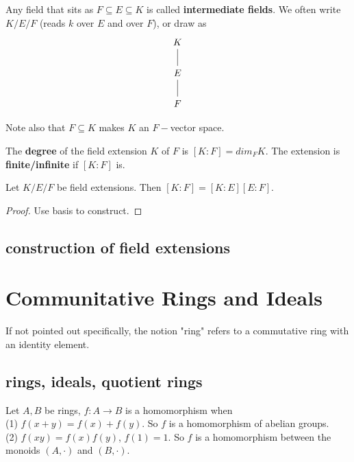 \documentclass[11pt,fleqn]{book} %
\begin{document}
\begin{CJK}{UTF8}{gkai}
\begin{definition}
	Any field that sits as $F \subseteq E \subseteq K$ is called {\bf intermediate fields}. We often write $K/E/F$ (reads $k$ over $E$ and over $F$), or draw as 
	\[\begin{tikzcd}
		K \\
		E \\
		F
		\arrow[no head, from=1-1, to=2-1]
		\arrow[no head, from=2-1, to=3-1]
	\end{tikzcd}\]

	Note also that $F \subseteq K$ makes $K$ an $F-$vector space.
\end{definition}

\begin{definition}
	The {\bf degree} of the field extension $K$ of $F$ is $[K : F] = dim_F K$. The extension is {\bf finite/infinite} if $[K : F]$ is.
\end{definition}

\begin{theorem}
	Let $K/E/F$ be field extensions. Then $[K:F] = [K:E][E:F]$.
\end{theorem}
\begin{proof}
	Use basis to construct.	
\end{proof}

\section{construction of field extensions}


\chapter{Communitative Rings and Ideals}
If not pointed out specifically, the notion "ring" refers to a commutative ring with an identity element. 

\section{rings, ideals, quotient rings}
\begin{definition}
	 Let $A, B$ be rings, $f : A\to B$ is a homomorphism when \\
	(1) $f(x+y) = f(x) + f(y)$. So $f$ is a homomorphism of abelian groups. \\
	(2) $f(xy) = f(x)f(y)$, $f(1) = 1$. So $f$ is a homomorphism between the monoids $(A, \cdot)$ and $(B, \cdot)$.


\end{definition}
\end{CJK}
\end{document}
